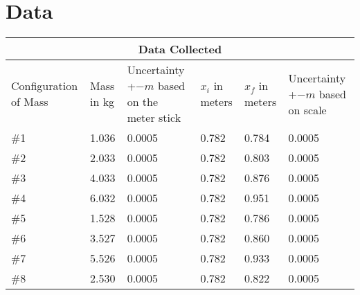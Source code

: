 \let\clearpage\relax\chapter{Data}
\endgroup

\begin{tabular}{ |p{2cm}|p{2cm}|p{2cm}|p{2cm}|p{2cm}|p{2cm}| }
  \hline
  \multicolumn{6}{|c|}{Data Collected} \\
  \hline
  Configuration of Mass & Mass in kg & Uncertainty +$-m$ based on the meter stick& $x_i$ in meters & $x_f$ in meters & Uncertainty +$-m$ based on scale\\
  \hline
  \#1& 1.036 &  0.0005 & 0.782 & 0.784 & 0.0005\\
  \hline
  \#2& 2.033 &  0.0005 & 0.782 & 0.803 & 0.0005\\
  \hline
  \#3& 4.033 &  0.0005 & 0.782 & 0.876 & 0.0005\\
  \hline
  \#4& 6.032 &  0.0005 & 0.782 & 0.951 & 0.0005\\
  \hline
  \#5& 1.528 &  0.0005 & 0.782 & 0.786 & 0.0005\\
  \hline
  \#6& 3.527 &  0.0005 & 0.782 & 0.860 & 0.0005\\
  \hline
  \#7& 5.526 &  0.0005 & 0.782 & 0.933 & 0.0005\\
  \hline
  \#8& 2.530 &  0.0005 & 0.782 & 0.822 & 0.0005\\
  \hline
\end{tabular}
